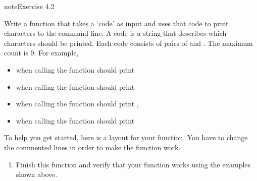 \documentclass[letterpaper,10pt,english]{jupyterBook}
\begin{document}
\begin{sphinxadmonition}{note}{Exercise 4.2}

\sphinxAtStartPar
Write a function  that takes a ‘code’ as input and uses that code to print characters to the command line. A code is a string that describes which characters should be printed. Each code consists of pairs of  and . The maximum count is 9. For example,
\begin{itemize}
\item {} 
\sphinxAtStartPar
when calling  the function should print \sphinxcode{\sphinxupquote{++++++}}

\item {} 
\sphinxAtStartPar
when calling  the function should print \sphinxcode{\sphinxupquote{++****+++++}}

\item {} 
\sphinxAtStartPar
when calling  the function should print \sphinxcode{\sphinxupquote{**++++******}},

\item {} 
\sphinxAtStartPar
when calling  the function should print 

\end{itemize}

\sphinxAtStartPar
To help you get started, here is a layout for your function. You have to change the commented lines in order to make the function work.

\begin{sphinxVerbatim}[commandchars=\\\{\}]
 
      
         
          \PYG{p}{[}\PYG{p}{]}
\end{sphinxVerbatim}
\begin{enumerate}
%
\item {} 
\sphinxAtStartPar
Finish this function and verify that your function works using the examples shown above.


\end{enumerate}
\end{sphinxadmonition}
\end{document}
